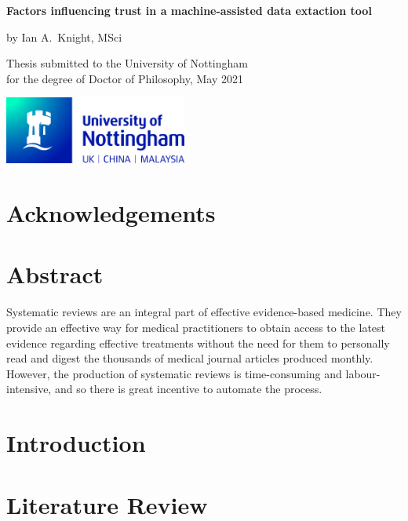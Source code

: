 \documentclass[11pt,a4paper,oneside]{report}
\begin{document}
\begin{titlepage}
    \centering

    \vspace*{1cm}
    \Huge
    \textbf{Factors influencing trust in a machine-assisted data extaction tool}

    \vspace{0.5cm}
    \LARGE
    by Ian A.~Knight, MSci

    \vfill
    \Large
    Thesis submitted to the University of Nottingham \\
    for the degree of Doctor of Philosophy, May 2021

    \vspace*{10mm}
    \includegraphics[width=60mm]{UoN_Primary_Logo_CMYK.jpg}
\end{titlepage}

\chapter*{Acknowledgements}


\tableofcontents
\listoffigures
\listoftables

\chapter*{Abstract}
Systematic reviews are an integral part of effective evidence-based medicine.
They provide an effective way for medical practitioners to obtain access to
the latest evidence regarding effective treatments without the need for them
to personally read and digest the thousands of medical journal articles produced
monthly. However, the production of systematic reviews is time-consuming and
labour-intensive, and so there is great incentive to automate the process.

\chapter{Introduction}


\chapter{Literature Review}

\end{document}
